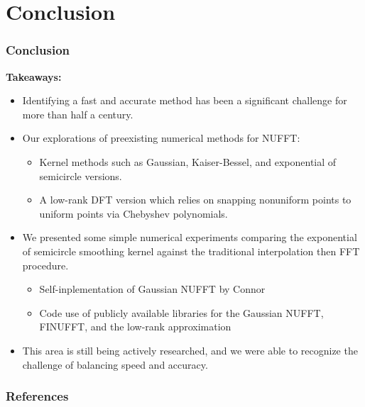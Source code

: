 \documentclass{beamer}
\begin{document}
\section{Conclusion}
\begin{frame}
  \frametitle{Conclusion}

  \textbf{Takeaways:}

 \begin{itemize}
   \item Identifying a fast and accurate method has been a significant challenge for more than half a century.
   \item Our explorations of preexisting numerical methods for NUFFT:
   \begin{itemize}
     \item Kernel methods such as Gaussian, Kaiser-Bessel, and exponential of semicircle versions.
     \item A low-rank DFT version which relies on snapping nonuniform points to uniform points via Chebyshev polynomials.
   \end{itemize}
   \item We presented some simple numerical experiments comparing the exponential of semicircle smoothing kernel against the traditional interpolation then FFT procedure.
   \begin{itemize}
     \item Self-inplementation of Gaussian NUFFT by Connor
     \item Code use of publicly available libraries for the Gaussian NUFFT, FINUFFT, and the low-rank approximation
   \end{itemize}
   \item This area is still being actively researched, and we were able to recognize the challenge of balancing speed and accuracy.
 \end{itemize}
\end{frame}

\begin{frame}[allowframebreaks]
  \frametitle{References}
  \printbibliography
\end{frame}
\end{document}
